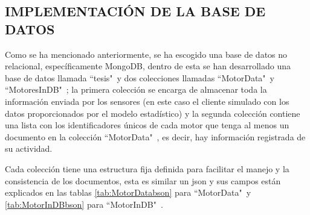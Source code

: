 

\subsection{IMPLEMENTACIÓN DE LA BASE DE DATOS}

    Como se ha mencionado anteriormente, se ha escogido una base de datos no
    relacional, específicamente MongoDB, dentro de esta se han desarrollado
    una base de datos llamada ``tesis"\   y dos colecciones llamadas ``MotorData"\  y
    ``MotoresInDB"\ ; la primera colección se encarga de almacenar toda la información
    enviada por los sensores (en este caso el cliente simulado con los datos
    proporcionados por el modelo estadístico) y la segunda colección contiene una
    lista con los identificadores únicos de cada motor que tenga al menos un documento
    en la colección ``MotorData"\ , es decir, hay información registrada de su actividad.

    Cada colección tiene una estructura fija definida para facilitar el manejo y
    la consistencia de los documentos, esta es similar un json y sus campos
    están explicados en las tablas \ref{tab:MotorDatabson} para ``MotorData"\  y
    \ref{tab:MotorInDBbson} para ``MotorInDB"\ .


